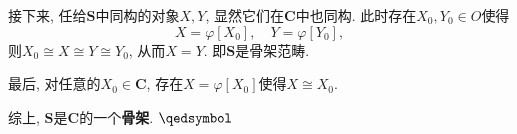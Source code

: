 \documentclass[UTF8]{ctexart}
\begin{document}
接下来, 任给$\mathbf{S}$中同构的对象$X,Y$, 显然它们在$\mathbf{C}$中也同构.
此时存在$X_0,Y_0\in O$使得
\[
    X=\varphi[X_0],\quad Y=\varphi[Y_0],
\]
则$X_0\cong X\cong Y\cong Y_0$, 从而$X=Y$. 即$\mathbf{S}$是骨架范畴.

最后, 对任意的$X_0\in\mathbf{C}$, 存在$X=\varphi[X_0]$使得$X\cong X_0$.

综上, $\mathbf{S}$是$\mathbf{C}$的一个\textbf{骨架}. \hfill $\qedsymbol$
\end{document}
